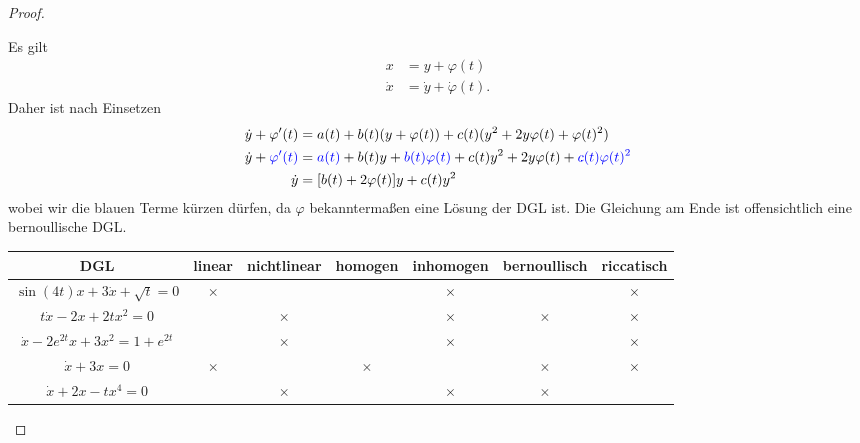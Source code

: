 \begin{proof}
\begin{parts}
\item Es gilt
	\begin{align*}
		x&=y+\varphi(t)\\
		\dot{x}&=\dot{y}+\dot{\varphi}(t).
	\end{align*}
	Daher ist nach Einsetzen
	\begin{align*}
		\dot{y}+\varphi'(t)&=a(t)+b(t)(y+\varphi(t))+c(t)(y^2+2y\varphi(t)+\varphi(t)^2) \\
		\dot{y}+\textcolor{blue}{\varphi'(t)}&=\textcolor{blue}{a(t)}+b(t)y+\textcolor{blue}{b(t)\varphi(t)}+c(t)y^2+2y\varphi(t)+\textcolor{blue}{c(t)\varphi(t)^2}\\
		\dot{y}&= [b(t)+2\varphi(t)]y + c(t)y^2
	\end{align*}
	wobei wir die blauen Terme kürzen dürfen, da $\varphi$ bekanntermaßen eine Lösung der DGL ist. Die Gleichung am Ende ist offensichtlich eine bernoullische DGL.
\item 

	\begin{tabular}{c|c|c|c|c|c|c}
	DGL & linear & nichtlinear & homogen & inhomogen & bernoullisch & riccatisch \\\hline
	$\sin(4t)x+3\dot{x}+\sqrt{t} =0$ & $\times$ & & & $\times $ & & $\times$ \\\hline
	$t\dot{x}-2x+2tx^2=0$ & & $\times$ & & $\times$ & $\times$ & $\times$ \\\hline
	$\dot{x}-2e^{2t}x+3x^2=1+e^{2t}$ & & $\times$ & & $\times$ & & $\times$ \\\hline
	$\dot{x}+3x=0$ & $\times$ & & $\times$ & & $\times$ & $\times$ \\\hline
	$\dot{x}+2x-tx^4=0$ & & $\times$ & & $\times$ & $\times$ & 
\end{tabular}
\end{parts}	
\end{proof}
